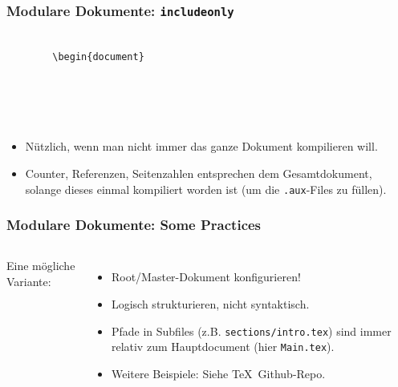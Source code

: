 \documentclass{beamer}                %
\newcommand*\code[1]{\texttt{#1}}
\begin{document}
\begin{frame}[fragile] %
    \frametitle{Modulare Dokumente: \code{includeonly}}
    \begin{verbatim}
        
        \begin{document}
        
        
        
        
    \end{verbatim}

    \begin{itemize}
        \item
            N\"utzlich, wenn  man nicht  immer das ganze  Dokument kompilieren
            will.
        \item
            Counter, Referenzen, Seitenzahlen  entsprechen dem Gesamtdokument,
            solange   dieses   einmal   kompiliert    worden   ist   (um   die
            \code{.aux}-Files zu f\"ullen).
    \end{itemize}
\end{frame}
\begin{frame}[fragile] %
    \frametitle{Modulare Dokumente: Some Practices}

    \begin{columns}
        Eine m\"ogliche Variante:
        {\small
        }



        \begin{itemize}
            \item
                Root/Master-Dokument konfigurieren!
            \item
                Logisch strukturieren, nicht syntaktisch.
            \item
                Pfade in Subfiles  (z.B. \code{sections/intro.tex}) sind immer
                relativ zum Hauptdocument (hier \code{Main.tex}).
            \item
                Weitere Beispiele: Siehe \TeX\ Github-Repo.
        \end{itemize}
    \end{columns}
\end{frame}
\end{document}
